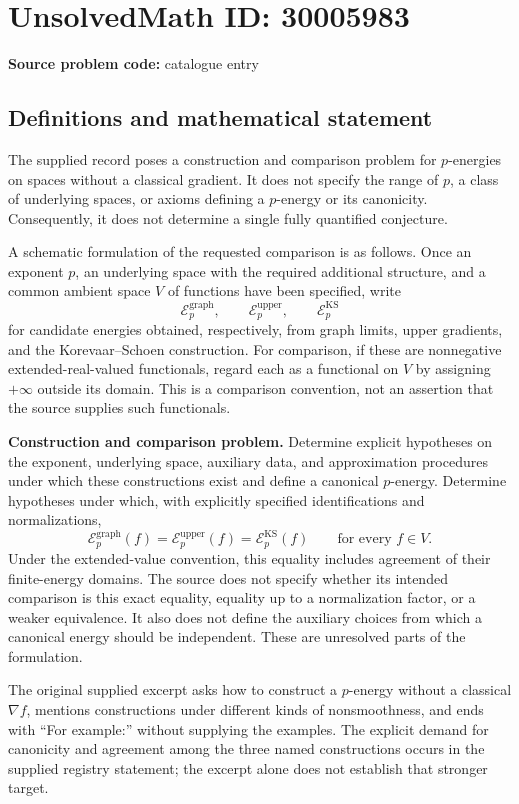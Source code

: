 \documentclass[11pt]{article}
\begin{document}
\section*{UnsolvedMath ID: 30005983}
\textbf{Source problem code:} catalogue entry
\subsection{Definitions and mathematical statement}
The supplied record poses a construction and comparison problem for \(p\)-energies on spaces without a classical gradient. It does not specify the range of \(p\), a class of underlying spaces, or axioms defining a \(p\)-energy or its canonicity. Consequently, it does not determine a single fully quantified conjecture.

A schematic formulation of the requested comparison is as follows. Once an exponent \(p\), an underlying space with the required additional structure, and a common ambient space \(V\) of functions have been specified, write
\[
\mathcal E_p^{\mathrm{graph}},\qquad
\mathcal E_p^{\mathrm{upper}},\qquad
\mathcal E_p^{\mathrm{KS}}
\]
for candidate energies obtained, respectively, from graph limits, upper gradients, and the Korevaar--Schoen construction. For comparison, if these are nonnegative extended-real-valued functionals, regard each as a functional on \(V\) by assigning \(+\infty\) outside its domain. This is a comparison convention, not an assertion that the source supplies such functionals.

\textbf{Construction and comparison problem.} Determine explicit hypotheses on the exponent, underlying space, auxiliary data, and approximation procedures under which these constructions exist and define a canonical \(p\)-energy. Determine hypotheses under which, with explicitly specified identifications and normalizations,
\[
\mathcal E_p^{\mathrm{graph}}(f)
=
\mathcal E_p^{\mathrm{upper}}(f)
=
\mathcal E_p^{\mathrm{KS}}(f)
\qquad\text{for every }f\in V.
\]
Under the extended-value convention, this equality includes agreement of their finite-energy domains. The source does not specify whether its intended comparison is this exact equality, equality up to a normalization factor, or a weaker equivalence. It also does not define the auxiliary choices from which a canonical energy should be independent. These are unresolved parts of the formulation.

The original supplied excerpt asks how to construct a \(p\)-energy without a classical \(\nabla f\), mentions constructions under different kinds of nonsmoothness, and ends with ``For example:'' without supplying the examples. The explicit demand for canonicity and agreement among the three named constructions occurs in the supplied registry statement; the excerpt alone does not establish that stronger target.
\end{document}
